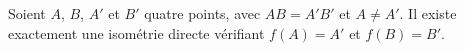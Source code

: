 Soient $A$, $B$, $A'$ et $B'$  quatre points, avec $AB=A'B'$ et $A\neq A'$. Il existe exactement une isométrie directe vérifiant $f(A)=A'$ et $f(B)=B'$.

\begin{reponses}
\end{reponses}

\begin{comment}
Si $A=B$, il y en a une infinité.
\end{comment}

